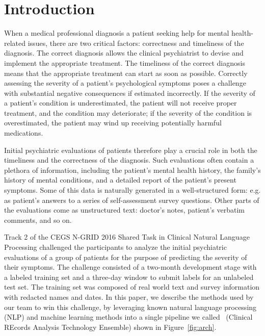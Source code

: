 \chapter{Introduction}\label{sec:intro}

When a medical professional diagnosis a patient seeking help for mental health-related issues, there are two 
critical factors: correctness and timeliness of the diagnosis. The correct diagnosis 
allows the clinical psychiatrist to devise and implement the appropriate
treatment. The timeliness of the correct diagnosis means that the appropriate treatment can start as soon as possible. 
Correctly assessing the severity of a patient's psychological symptoms poses a challenge with substantial negative consequences if estimated incorrectly.
If the severity of a patient's condition
is underestimated, the patient will not receive proper treatment, and the condition
may deteriorate; if the severity of the condition is overestimated, the
patient may wind up receiving potentially harmful medications.

Initial psychiatric evaluations of patients therefore play a crucial role in 
both the timeliness and the correctness of the diagnosis. Such evaluations 
often contain a plethora of information, including the patient's mental health history, the family's history of mental conditions, and a detailed report of the patient's 
present symptoms. Some of this data is naturally generated in a well-structured form: e.g. as patient's answers to a series of self-assessment survey questions.
Other parts of the evaluations come as unstructured text: doctor's notes, patient's verbatim comments, and so on.

Track 2 of the CEGS N-GRID 2016 Shared Task in Clinical Natural Language Processing
challenged the participants to 
analyze the initial psychiatric evaluations of a group of patients for the purpose of predicting the severity of their symptoms. The challenge consisted of a two-month development stage with a labeled training set and a three-day window to submit labels for an unlabeled test set. The training set was composed of real world text and survey information with redacted names and dates. 
In this paper, we describe the methods used by our team to win this challenge, by leveraging known natural language processing (NLP) and machine learning methods into a
single pipeline we called \CREATE\ (Clinical REcords Analysis Technology Ensemble) shown in Figure~\ref{fig:arch}.


